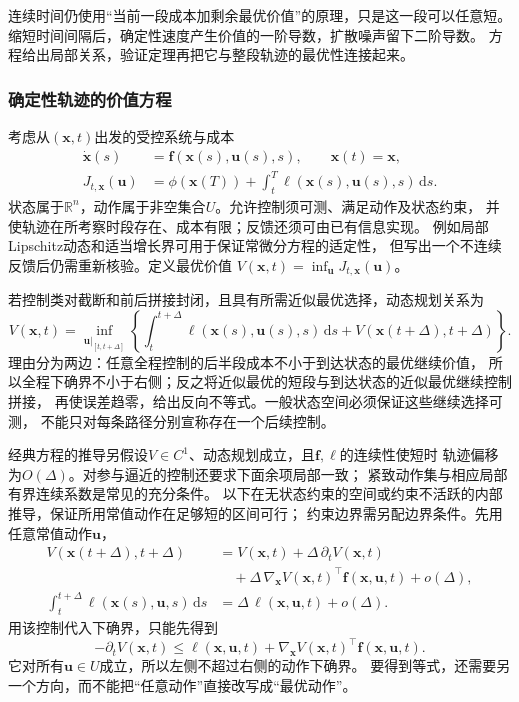 连续时间仍使用“当前一段成本加剩余最优价值”的原理，只是这一段可以任意短。
缩短时间间隔后，确定性速度产生价值的一阶导数，扩散噪声留下二阶导数。
方程给出局部关系，验证定理再把它与整段轨迹的最优性连接起来。

\subsubsection{确定性轨迹的价值方程}

考虑从$(\bm x,t)$出发的受控系统与成本
\begin{align}
  \dot{\bm x}(s)&=\bm f(\bm x(s),\bm u(s),s),\qquad \bm x(t)=\bm x,
  \label{eq:control-continuous-dynamics}\\
  J_{t,\bm x}(\bm u)
  &=\phi(\bm x(T))+\int_t^T\ell(\bm x(s),\bm u(s),s)\,\mathrm ds.
  \label{eq:control-continuous-cost}
\end{align}
状态属于$\mathbb R^n$，动作属于非空集合$U$。允许控制须可测、满足动作及状态约束，
并使轨迹在所考察时段存在、成本有限；反馈还须可由已有信息实现。
例如局部Lipschitz动态和适当增长界可用于保证常微分方程的适定性，
但写出一个不连续反馈后仍需重新核验。定义最优价值
$V(\bm x,t)=\inf_{\bm u}J_{t,\bm x}(\bm u)$。

若控制类对截断和前后拼接封闭，且具有所需近似最优选择，动态规划关系为
\begin{equation}
  V(\bm x,t)=\inf_{\bm u|_{[t,t+\Delta]}}
  \left\{\int_t^{t+\Delta}\ell(\bm x(s),\bm u(s),s)\,\mathrm ds
    +V(\bm x(t+\Delta),t+\Delta)\right\}.
  \label{eq:control-continuous-dpp}
\end{equation}
理由分为两边：任意全程控制的后半段成本不小于到达状态的最优继续价值，
所以全程下确界不小于右侧；反之将近似最优的短段与到达状态的近似最优继续控制拼接，
再使误差趋零，给出反向不等式。一般状态空间必须保证这些继续选择可测，
不能只对每条路径分别宣称存在一个后续控制。

经典方程的推导另假设$V\in C^1$、动态规划成立，且$\bm f,\ell$的连续性使短时
轨迹偏移为$O(\Delta)$。对参与逼近的控制还要求下面余项局部一致；
紧致动作集与相应局部有界连续系数是常见的充分条件。
以下在无状态约束的空间或约束不活跃的内部推导，保证所用常值动作在足够短的区间可行；
约束边界需另配边界条件。先用任意常值动作$\bm u$，
\begin{align*}
  V(\bm x(t+\Delta),t+\Delta)
  &=V(\bm x,t)+\Delta\,\partial_tV(\bm x,t)\\
  &\quad+\Delta\,\nabla_{\bm x}V(\bm x,t)^\top\bm f(\bm x,\bm u,t)
    +o(\Delta),\\
  \int_t^{t+\Delta}\ell(\bm x(s),\bm u,s)\,\mathrm ds
  &=\Delta\,\ell(\bm x,\bm u,t)+o(\Delta).
\end{align*}
用该控制代入下确界，只能先得到
\[
  -\partial_tV(\bm x,t)
  \leq\ell(\bm x,\bm u,t)+\nabla_{\bm x}V(\bm x,t)^\top\bm f(\bm x,\bm u,t).
\]
它对所有$\bm u\in U$成立，所以左侧不超过右侧的动作下确界。
要得到等式，还需要另一个方向，而不能把“任意动作”直接改写成“最优动作”。

